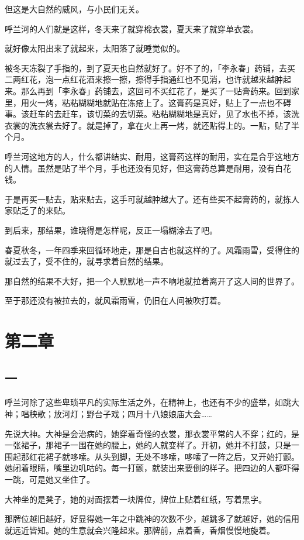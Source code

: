 \documentclass[UTF8]{ctexart}
\begin{document}
但这是大自然的威风，与小民们无关。

呼兰河的人们就是这样，冬天来了就穿棉衣裳，夏天来了就穿单衣裳。

就好像太阳出来了就起来，太阳落了就睡觉似的。

被冬天冻裂了手指的，到了夏天也自然就好了。好不了的，「李永春」药铺，去买二两红花，泡一点红花酒来擦一擦，擦得手指通红也不见消，也许就越来越肿起来。那么再到「李永春」药铺去，这回可不买红花了，是买了一贴膏药来。回到家里，用火一烤，粘粘糊糊地就贴在冻疮上了。这膏药是真好，贴上了一点也不碍事。该赶车的去赶车，该切菜的去切菜。粘粘糊糊地是真好，见了水也不掉，该洗衣裳的洗衣裳去好了。就是掉了，拿在火上再一烤，就还贴得上的。一贴，贴了半个月。

呼兰河这地方的人，什么都讲结实、耐用，这膏药这样的耐用，实在是合乎这地方的人情。虽然是贴了半个月，手也还没有见好，但这膏药总算是耐用，没有白花钱。

于是再买一贴去，贴来贴去，这手可就越肿越大了。还有些买不起膏药的，就拣人家贴乏了的来贴。

到后来，那结果，谁晓得是怎样呢，反正{一塌糊涂去了}吧。

春夏秋冬，一年四季来回循环地走，那是自古也就这样的了。风霜雨雪，受得住的就过去了，受不住的，就寻求着自然的结果。

那自然的结果不大好，把一个人默默地一声不响地就拉着离开了这人间的世界了。

至于那还没有被拉去的，就风霜雨雪，仍旧在人间被吹打着。

\section{第二章}

\subsection{一}

呼兰河除了这些卑琐平凡的实际生活之外，在精神上，也还有不少的盛举，如跳大神；唱秧歌；放河灯；野台子戏；四月十八娘娘庙大会……

先说大神。大神是会治病的，她穿着奇怪的衣裳，那衣裳平常的人不穿；红的，是一张裙子，那裙子一围在她的腰上，她的人就变样了。开初，她并不打鼓，只是一围起那红花裙子就哆嗦。从头到脚，无处不哆嗦，哆嗦了一阵之后，又开始打颤。她闭着眼睛，嘴里边叽咕的。每一打颤，就装出来要倒的样子。把四边的人都吓得一跳，可是她又坐住了。

大神坐的是凳子，她的对面摆着一块牌位，牌位上贴着红纸，写着黑字。

那牌位越旧越好，好显得她一年之中跳神的次数不少，越跳多了就越好，她的信用就远近皆知。她的生意就会兴隆起来。那牌前，点着香，香烟慢慢地旋着。
\end{document}
